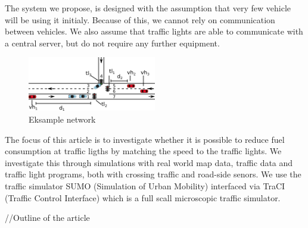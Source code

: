 The system we propose, is designed with the assumption that very few vehicle will be using it initialy. 
Because of this, we cannot rely on communication between vehicles.
We also assume that traffic lights are able to communicate with a central server, but do not require any further equipment.









\begin{figure}[htb]
\centering
\includegraphics[width=0.5\textwidth]{images/introNetwork.png}
\caption{Eksample network}
\label{fig:Introduction:network}
\end{figure}



The focus of this article is to investigate whether it is possible to reduce fuel consumption at traffic ligths by matching the speed to the traffic lights. 
We investigate this through simulations with real world map data, traffic data and traffic light programs, both with crossing traffic and road-side senors. %
We use the traffic simulator SUMO (Simulation of Urban Mobility)\cite{sumo} interfaced via TraCI (Traffic Control Interface)\cite{traci} which is a full scall microscopic traffic simulator.

//Outline of the article





